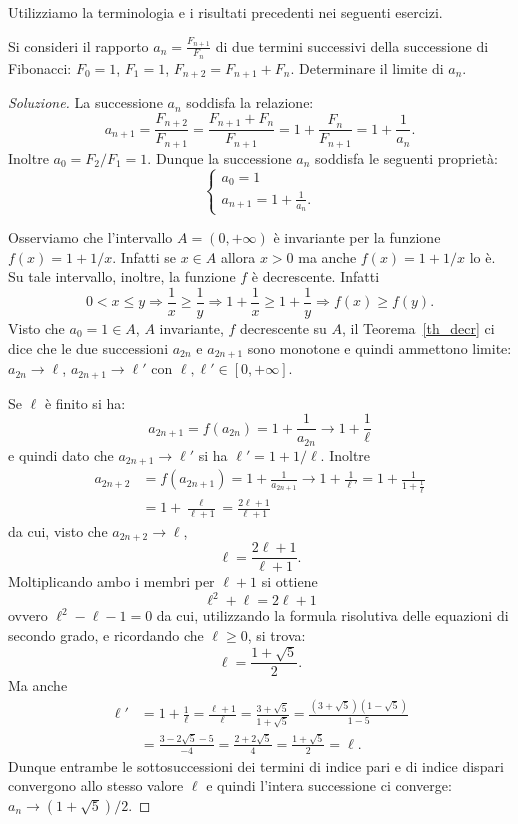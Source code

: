 Utilizziamo la terminologia e i risultati precedenti nei seguenti
esercizi.

\begin{exercise}[Fibonacci]\label{ex_fibonacci}
  Si consideri il rapporto $a_n = \frac{F_{n+1}}{F_n}$ di due termini
  successivi della successione di Fibonacci: $F_0=1$, $F_1=1$,
  $F_{n+2} = F_{n+1} + F_n$. Determinare il limite di $a_n$.
\end{exercise}

\begin{proof}[Soluzione]
  La successione $a_n$ soddisfa la relazione:
  \[
   a_{n+1} = \frac{F_{n+2}}{F_{n+1}} = \frac{F_{n+1}+F_n}{F_{n+1}} = 1
   + \frac{F_n}{F_{n+1}} = 1 + \frac{1}{a_n}.
   \]
   Inoltre $a_0=F_2 / F_1 = 1$. Dunque la successione $a_n$ soddisfa
   le seguenti proprietà:
   \[
   \begin{cases}
     a_0 = 1 \\
     a_{n+1} = 1 + \frac{1}{a_n}.
   \end{cases}
   \]

   Osserviamo che l'intervallo $A=(0,+\infty)$ è invariante per la
   funzione $f(x) = 1+1/x$. Infatti
   se $x\in A$ allora $x>0$ ma anche $f(x) = 1+1/x$ lo è.
   Su tale intervallo, inoltre, la funzione $f$ è decrescente. Infatti
   \[
   0 < x \le y \Rightarrow \frac 1 x \ge \frac 1 y \Rightarrow 1+\frac
   1 x \ge 1 + \frac 1 y
   \Rightarrow f(x) \ge f(y).
   \]
   Visto che $a_0 = 1 \in A$, $A$ invariante, $f$ decrescente su $A$,
   il Teorema~\ref{th_decr} ci dice che le due successioni $a_{2n}$ e
   $a_{2n+1}$ sono monotone e quindi ammettono limite: $a_{2n}\to
   \ell$, $a_{2n+1} \to \ell'$ con $\ell,\ell' \in [0,+\infty]$.

   Se $\ell$ è finito si ha:
   \[
   a_{2n+1} = f(a_{2n}) = 1+ \frac{1}{a_{2n}} \to 1 + \frac{1}{\ell}
   \]
   e quindi dato che $a_{2n+1}\to \ell'$ si ha $\ell' = 1 + 1/\ell$.
   Inoltre
   \begin{align*}
   a_{2n+2} &= f(a_{2n+1}) = 1 + \frac{1}{a_{2n+1}} \to 1 +
   \frac{1}{\ell'}
   = 1 + \frac{1}{1+\frac{1}{\ell}} \\
   & = 1 + \frac{\ell}{\ell+1}
   = \frac{2\ell +1}{\ell +1}
   \end{align*}
   da cui, visto che $a_{2n+2}\to \ell$,
   \[
   \ell = \frac{2\ell +1 }{\ell +1}.
   \]
   Moltiplicando ambo i membri per $\ell+1$ si ottiene
   \[
    \ell^2 + \ell = 2\ell + 1
    \]
    ovvero $\ell^2 - \ell -1 =0$ da cui, utilizzando la formula
    risolutiva delle equazioni di secondo grado, e ricordando che
    $\ell \ge 0$, si trova:
    \[
    \ell = \frac{1 + \sqrt{5}}{2}.
    \]
    Ma anche
    \begin{align*}
    \ell' &= 1 + \frac 1 \ell = \frac{\ell + 1}{\ell} = \frac{3+\sqrt
      5}{1 + \sqrt 5} = \frac{(3+\sqrt 5)(1-\sqrt 5)}{1-5} \\
     &= \frac{3-2\sqrt 5-5}{-4} = \frac{2+2\sqrt 5}{4} = \frac{1+\sqrt
       5}{2} = \ell.
    \end{align*}
    Dunque entrambe le sottosuccessioni dei termini di indice pari e
    di indice dispari convergono allo stesso valore $\ell$ e quindi
    l'intera successione ci converge: $a_n\to (1+\sqrt 5)/2$.


\end{proof}
